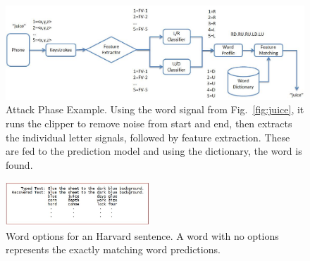\documentclass[11pt,conference]{IEEEtran}
\begin{document}
\begin{figure}
\centering
\includegraphics[width=.9\textwidth]{flowchart2}
\caption{Attack Phase Example. Using the word signal from Fig.~\ref{fig:juice}, it runs the clipper to remove noise from
start and end, then extracts the individual letter signals, followed by feature extraction. These are fed to the prediction
model and using the dictionary, the word is found.}
\label{fig:flowchart2}
\end{figure}

\begin{figure}
\centering
\includegraphics[width=0.48\textwidth]{img/words-options}
\caption{Word options for an Harvard sentence. A word with no options represents the
exactly matching word predictions.}
\label{fig:words-options}
\end{figure}

\begin{table}[h]
\centering
{%
{}
}
\caption{Test accuracies of different machine learning algorithms on the test dataset.}
\label{tab:algos-compare}
\end{table}
\end{document}
